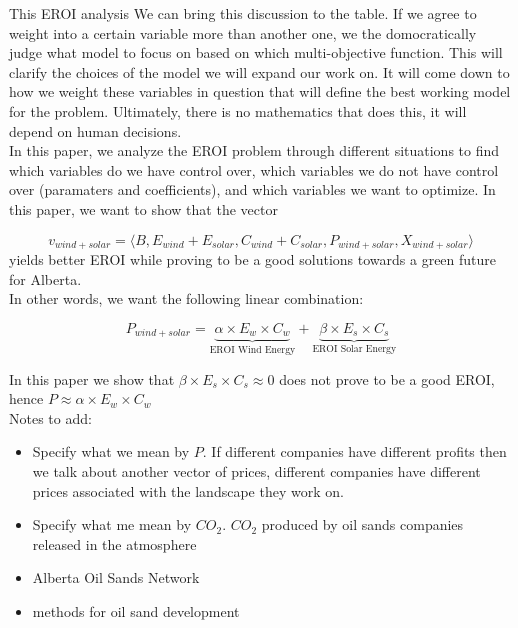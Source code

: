 \documentclass[12pt]{article}
\begin{document}
This EROI analysis We can bring this discussion to the table. If we agree to weight into a certain variable more than another one, we the domocratically judge what model to focus on based on which multi-objective function. This will clarify the choices of the model we will expand our work on. It will come down to how we weight these variables in question that will define the best working model for the problem. Ultimately, there is no mathematics that does this, it will depend on human decisions. \\

In this paper, we analyze the EROI problem through different situations to find which variables do we have control over, which variables we do not have control over (paramaters and coefficients), and which variables we want to optimize. In this paper, we want to show that the vector 

\begin{displaymath}
v_{wind+solar}= \langle B, E_{wind} + E_{solar}, C_{wind} + C_{solar}, P_{wind + solar}, X_{wind+solar}\rangle
\end{displaymath}
 yields better EROI while proving to be a good solutions towards a green future for Alberta. \\

In other words, we want the following linear combination:

\begin{displaymath}
P_{wind+solar} = \underbrace{\alpha \times E_w \times C_w}_\text{EROI Wind Energy} + \underbrace{ \beta \times E_s \times C_s}_\text{EROI Solar Energy}
\end{displaymath}

In this paper we show that $\beta \times E_s \times C_s \approx 0$ does not prove to be a good EROI, hence $P \approx \alpha \times E_w \times C_w $\\

Notes to add:
\begin{itemize}
\item Specify what we mean by $P$. If different companies have different profits then we talk about another vector of prices, different companies have different prices associated with the landscape they work on.
\item Specify what me mean by $CO_2$.  $CO_2$ produced by oil sands companies released in the atmosphere 
\item Alberta Oil Sands Network
\item methods for oil sand development
\end{itemize}
\end{document}
